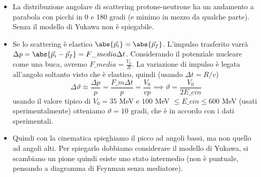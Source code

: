 \begin{itemize}
    \item La distribuzione angolare di scattering protone-neutrone ha un andamento a parabola con picchi in 0 e 180 gradi (e minimo in mezzo da qualche parte). Senza il modello di Yukawa non è spiegabile.
    \item Se lo scattering è elastico $\abs{\vec p_i}=\abs{\vec p_f}$. L'impulso trasferito varrà $\Delta p = \abs{\vec p_i-\vec p_f}=F\_{media}\Delta t$. Considerando il potenziale nucleare come una buca, avremo $F\_{media}=\frac{V_0}R$. La variazione di impulso è legata all'angolo soltanto visto che è elastico, quindi  (usando $\Delta t=R/v$)
    \begin{equation*}
        \Delta \vartheta\approx \frac{\Delta p} p=\frac{F\_m\Delta t}p=\frac{V_0}{vp}\implies \vartheta=\frac{V_0}{2E\_{cin}}
    \end{equation*}
    usando il valore tipico di $V_0=35$ MeV e $100$ MeV $\leq E\_{cin}\leq600$ MeV (usati sperimentalmente) otteniamo $\vartheta=10$ gradi, che è in accordo con i dati sperimentali. 
    \item Quindi con la cinematica spieghiamo il picco ad angoli bassi, ma non quello ad angoli alti. Per spiegarlo dobbiamo considerare il modello di Yukawa, si scambiano un pione quindi esiste uno stato intermedio (non è puntuale, pensando a diagramma di Feynman senza mediatore).
\end{itemize}
